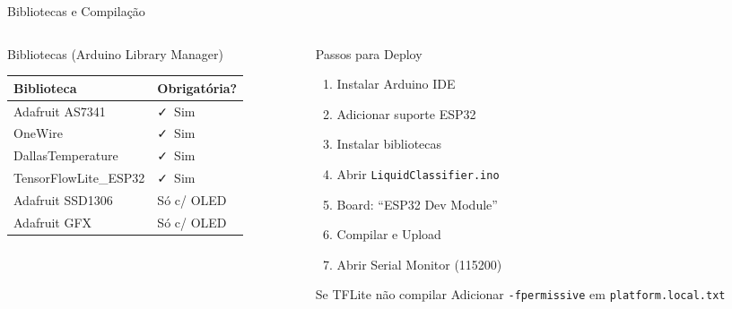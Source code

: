 \documentclass[aspectratio=169, 11pt]{beamer}
\begin{document}
\begin{frame}{Bibliotecas e Compilação}
  \begin{columns}[T]
    \begin{column}{0.48\textwidth}
      \begin{block}{Bibliotecas (Arduino Library Manager)}
        \begin{tabular}{ll}
          \toprule
          \textbf{Biblioteca} & \textbf{Obrigatória?} \\
          \midrule
          Adafruit AS7341 & \textcolor{green!60!black}{\faCheck}\ Sim \\
          OneWire & \textcolor{green!60!black}{\faCheck}\ Sim \\
          DallasTemperature & \textcolor{green!60!black}{\faCheck}\ Sim \\
          TensorFlowLite\_ESP32 & \textcolor{green!60!black}{\faCheck}\ Sim \\
          Adafruit SSD1306 & Só c/ OLED \\
          Adafruit GFX & Só c/ OLED \\
          \bottomrule
        \end{tabular}
      \end{block}
    \end{column}
    \begin{column}{0.48\textwidth}
      \begin{block}{Passos para Deploy}
        \begin{enumerate}
          \item Instalar Arduino IDE
          \item Adicionar suporte ESP32
          \item Instalar bibliotecas
          \item Abrir \texttt{LiquidClassifier.ino}
          \item Board: ``ESP32 Dev Module''
          \item Compilar e Upload
          \item Abrir Serial Monitor (115200)
        \end{enumerate}
      \end{block}
      \vspace{0.2cm}
      \begin{alertblock}{\small Se TFLite não compilar}
        \small Adicionar \texttt{-fpermissive} em \texttt{platform.local.txt}
      \end{alertblock}
    \end{column}
  \end{columns}
\end{frame}
\end{document}
